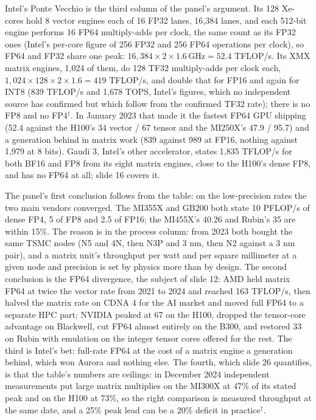 \documentclass[11pt,letterpaper]{article}
\begin{document}
Intel's Ponte Vecchio is the third column of the panel's argument. Its 128 Xe-cores hold 8 vector engines each of 16 FP32 lanes, 16{,}384 lanes, and each 512-bit engine performs 16 FP64 multiply-adds per clock, the same count as its FP32 ones (Intel's per-core figure of 256 FP32 and 256 FP64 operations per clock), so FP64 and FP32 share one peak: $16{,}384\times2\times1.6\,\text{GHz}=52.4$ TFLOP/s. Its XMX matrix engines, 1{,}024 of them, do 128 TF32 multiply-adds per clock each, $1{,}024\times128\times2\times1.6=419$ TFLOP/s, and double that for FP16 and again for INT8 (839 TFLOP/s and 1{,}678 TOPS, Intel's figures, which no independent source has confirmed but which follow from the confirmed TF32 rate); there is no FP8 and no FP4$^\dagger$. In January 2023 that made it the fastest FP64 GPU shipping (52.4 against the H100's 34 vector / 67 tensor and the MI250X's 47.9 / 95.7) and a generation behind in matrix work (839 against 989 at FP16, nothing against 1{,}979 at 8 bits). Gaudi 3, Intel's other accelerator, states 1{,}835 TFLOP/s for both BF16 and FP8 from its eight matrix engines, close to the H100's dense FP8, and has no FP64 at all; slide 16 covers it.

The panel's first conclusion follows from the table: on the low-precision rates the two main vendors converged. The MI355X and GB200 both state 10 PFLOP/s of dense FP4, 5 of FP8 and 2.5 of FP16; the MI455X's 40.26 and Rubin's 35 are within 15\%. The reason is in the process column: from 2023 both bought the same TSMC nodes (N5 and 4N, then N3P and 3 nm, then N2 against a 3 nm pair), and a matrix unit's throughput per watt and per square millimeter at a given node and precision is set by physics more than by design. The second conclusion is the FP64 divergence, the subject of slide 12: AMD held matrix FP64 at twice the vector rate from 2021 to 2024 and reached 163 TFLOP/s, then halved the matrix rate on CDNA 4 for the AI market and moved full FP64 to a separate HPC part; NVIDIA peaked at 67 on the H100, dropped the tensor-core advantage on Blackwell, cut FP64 almost entirely on the B300, and restored 33 on Rubin with emulation on the integer tensor cores offered for the rest. The third is Intel's bet: full-rate FP64 at the cost of a matrix engine a generation behind, which won Aurora and nothing else. The fourth, which slide 26 quantifies, is that the table's numbers are ceilings: in December 2024 independent measurements put large matrix multiplies on the MI300X at 47\% of its stated peak and on the H100 at 73\%, so the right comparison is measured throughput at the same date, and a 25\% peak lead can be a 20\% deficit in practice$^\dagger$.
\end{document}
